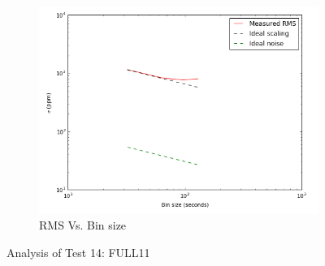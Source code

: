 \documentclass{aastex6}
\begin{document}
\begin{figure}[H]
    \begin{subfigure}{3}
        \includegraphics[scale=0.6]{rms_test14}
        \caption{RMS Vs. Bin size}
    \end{subfigure}
    \caption{Analysis of Test 14: FULL11}
\end{figure}
\end{document}
